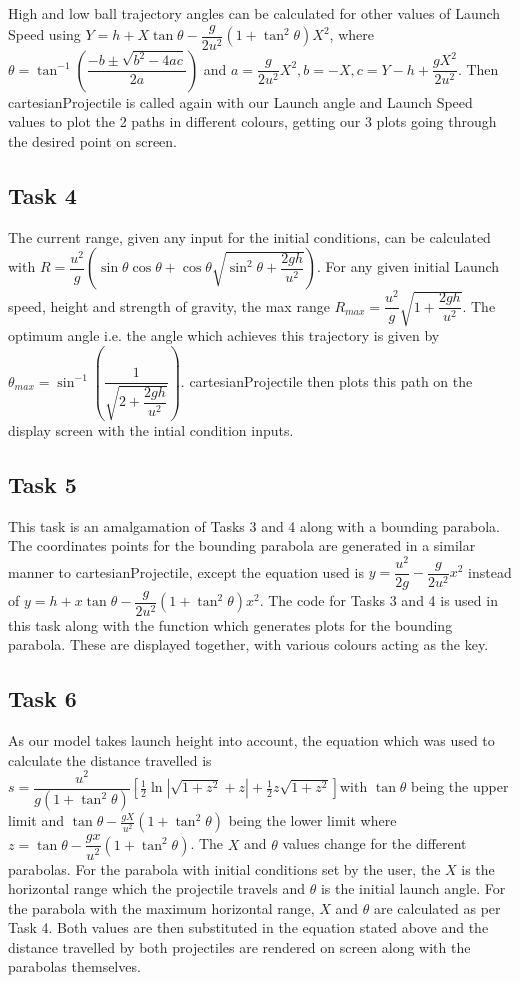 \documentclass[main.tex]{subfiles}
\begin{document}
\noindent High and low ball trajectory angles can be calculated for other values of Launch Speed using $Y = h + X\tan\theta -\dfrac{g}{2u^2}\left(1+\tan^2\theta \right)X^2$, where $\theta = \tan^{-1}\left(\dfrac{-b\pm\sqrt{b^2-4ac}}{2a}\right)$ and $a = \dfrac{g}{2u^2}X^2, b = -X, c = Y -h + \dfrac{gX^2}{2u^2}$. Then cartesianProjectile is called again with our Launch angle and Launch Speed values to plot the 2 paths in different colours, getting our 3 plots going through the desired point on screen.

\subsection{Task 4}
The current range, given any input for the initial conditions, can be calculated with $R = \dfrac{u^2}{g}\left(\sin\theta \cos\theta + \cos\theta\sqrt{\sin^2 \theta + \dfrac{2gh}{u^2}}\right)$. For any given initial Launch speed, height and strength of gravity, the max range $R_{max} = \dfrac{u^2}{g}\sqrt{1+\dfrac{2gh}{u^2}}$. The optimum angle i.e. the angle which achieves this trajectory is given by $\theta_{max} = \sin^{-1}\left(\dfrac{1}{\sqrt{2+\dfrac{2gh}{u^2}}} \right)$. cartesianProjectile then plots this path on the display screen with the intial condition inputs.

\subsection{Task 5}
This task is an amalgamation of Tasks 3 and 4 along with a bounding parabola. The coordinates points for the bounding parabola are generated in a similar manner to cartesianProjectile, except the equation used is $y=\dfrac{u^2}{2g} - \dfrac{g}{2u^2}x^2$ instead of $y = h + x\tan\theta -\dfrac{g}{2u^2}\left(1+\tan^2\theta\right)x^2$. The code for Tasks 3 and 4 is used in this task along with the function which generates plots for the bounding parabola. These are displayed together, with various colours acting as the key.

\subsection{Task 6}
As our model takes launch height into account, the equation which was used to calculate the distance travelled is $s = \dfrac{u^2}{g\left(1+\tan^2\theta\right)}\left[\frac{1}{2}\ln|\sqrt{1+z^2}+ z| + \frac{1}{2}z\sqrt{1+z^2}\right]$with $\tan \theta$ being the upper limit and $\tan\theta-\frac{gX}{u^2}(1+\tan^2\theta)$ being the lower limit where $z = \tan\theta - \dfrac{gx}{u^2}(1+\tan^2\theta)$. The $X$ and $\theta$ values change for the different parabolas. For the parabola with initial conditions set by the user, the $X$ is the horizontal range which the projectile travels and $\theta$ is the initial launch angle. For the parabola with the maximum horizontal range, $X$ and $\theta$ are calculated as per Task 4. Both values are then substituted in the equation stated above and the distance travelled by both projectiles are rendered on screen along with the parabolas themselves.
\end{document}

